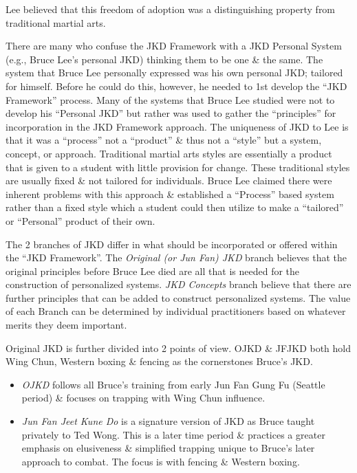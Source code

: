 \documentclass{article}
\begin{document}
{\sc Lee} believed that this freedom of adoption was a distinguishing property from traditional martial arts.

There are many who confuse the JKD Framework with a JKD Personal System (e.g., {\sc Bruce Lee}'s personal JKD) thinking them to be one \& the same. The system that {\sc Bruce Lee} personally expressed was his own personal JKD; tailored for himself. Before he could do this, however, he needed to 1st develop the ``JKD Framework'' process. Many of the systems that {\sc Bruce Lee} studied were not to develop his ``Personal JKD'' but rather was used to gather the ``principles'' for incorporation in the JKD Framework approach. The uniqueness of JKD to {\sc Lee}  is that it was a ``process'' not a ``product'' \& thus not a ``style'' but a system, concept, or approach. Traditional martial arts styles are essentially a product that is given to a student with little provision for change. These traditional styles are usually fixed \& not tailored for individuals. {\sc Bruce Lee} claimed there were inherent problems with this approach \& established a ``Process'' based system rather than a fixed style which a student could then utilize to make a ``tailored'' or ``Personal'' product of their own.

The 2 branches of JKD differ in what should be incorporated or offered within the ``JKD Framework''. The {\it Original (or Jun Fan) JKD} branch believes that the original principles before {\sc Bruce Lee} died are all that is needed for the construction of personalized systems. {\it JKD Concepts} branch believe that there are further principles that can be added to construct personalized systems. The value of each Branch can be determined by individual practitioners based on whatever merits they deem important.

Original JKD is further divided into 2 points of view. OJKD \& JFJKD both hold Wing Chun, Western boxing \& fencing as the cornerstones {\sc Bruce}'s JKD.
\begin{itemize}
	\item {\it OJKD} follows all {\sc Bruce}'s training from early Jun Fan Gung Fu (Seattle period) \& focuses on trapping with Wing Chun influence.
	\item {\it Jun Fan Jeet Kune Do} is a signature version of JKD as {\sc Bruce} taught privately to {\sc Ted Wong}. This is a later time period \& practices a greater emphasis on elusiveness \& simplified trapping unique to {\sc Bruce}'s later approach to combat. The focus is with fencing \& Western boxing.
\end{itemize}
\end{document}

